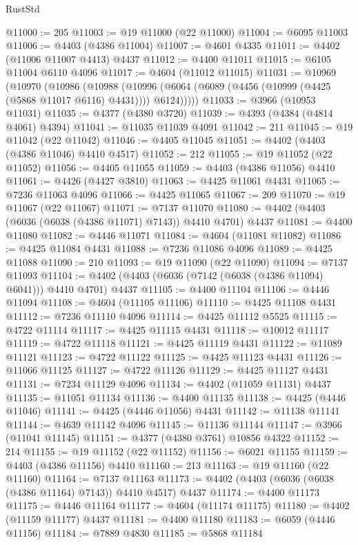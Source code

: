 \begin{lexlean}{RustStd}
\begin{coremodule}
@11000 := 205
@11003 := @19 @11000 (@22 @11000)
@11004 := @6095 @11003
@11006 := @4403 (@4386 @11004)
@11007 := @4601 @4335
@11011 := @4402 (@11006 @11007 @4413) @4437
@11012 := @4400 @11011
@11015 := @6105 @11004 @6110 @4096
@11017 := @4604 (@11012 @11015)
@11031 := @10969
    (@10970
      (@10986
        (@10988
          (@10996 (@6064 (@6089 (@4456 (@10999 (@4425 (@5868 @11017 @6116) @4431)))) @6124)))))
@11033 := @3966 (@10953 @11031)
@11035 := @4377 (@4380 @3720)
@11039 := @4393 (@4384 (@4814 @4061) @4394)
@11041 := @11035 @11039 @4091
@11042 := 211
@11045 := @19 @11042 (@22 @11042)
@11046 := @4405 @11045
@11051 := @4402 (@4403 (@4386 @11046) @4410 @4517)
@11052 := 212
@11055 := @19 @11052 (@22 @11052)
@11056 := @4405 @11055
@11059 := @4403 (@4386 @11056) @4410
@11061 := @4426 (@4427 @3810)
@11063 := @4425 @11061 @4431
@11065 := @7236 @11063 @4096
@11066 := @4425 @11065
@11067 := 209
@11070 := @19 @11067 (@22 @11067)
@11071 := @7137 @11070
@11080 := @4402 (@4403 (@6036 (@6038 (@4386 @11071) @7143)) @4410 @4701) @4437
@11081 := @4400 @11080
@11082 := @4446 @11071
@11084 := @4604 (@11081 @11082)
@11086 := @4425 @11084 @4431
@11088 := @7236 @11086 @4096
@11089 := @4425 @11088
@11090 := 210
@11093 := @19 @11090 (@22 @11090)
@11094 := @7137 @11093
@11104 := @4402 (@4403 (@6036 (@7142 (@6038 (@4386 @11094) @6041))) @4410 @4701) @4437
@11105 := @4400 @11104
@11106 := @4446 @11094
@11108 := @4604 (@11105 @11106)
@11110 := @4425 @11108 @4431
@11112 := @7236 @11110 @4096
@11114 := @4425 @11112 @5525
@11115 := @4722 @11114
@11117 := @4425 @11115 @4431
@11118 := @10012 @11117
@11119 := @4722 @11118
@11121 := @4425 @11119 @4431
@11122 := @11089 @11121
@11123 := @4722 @11122
@11125 := @4425 @11123 @4431
@11126 := @11066 @11125
@11127 := @4722 @11126
@11129 := @4425 @11127 @4431
@11131 := @7234 @11129 @4096
@11134 := @4402 (@11059 @11131) @4437
@11135 := @11051 @11134
@11136 := @4400 @11135
@11138 := @4425 (@4446 @11046)
@11141 := @4425 (@4446 @11056) @4431
@11142 := @11138 @11141
@11144 := @4639 @11142 @4096
@11145 := @11136 @11144
@11147 := @3966 (@11041 @11145)
@11151 := @4377 (@4380 @3761) @10856 @4322
@11152 := 214
@11155 := @19 @11152 (@22 @11152)
@11156 := @6021 @11155
@11159 := @4403 (@4386 @11156) @4410
@11160 := 213
@11163 := @19 @11160 (@22 @11160)
@11164 := @7137 @11163
@11173 := @4402 (@4403 (@6036 (@6038 (@4386 @11164) @7143)) @4410 @4517) @4437
@11174 := @4400 @11173
@11175 := @4446 @11164
@11177 := @4604 (@11174 @11175)
@11180 := @4402 (@11159 @11177) @4437
@11181 := @4400 @11180
@11183 := @6059 (@4446 @11156)
@11184 := @7889 @4830
@11185 := @5868 @11184

\end{coremodule}
\end{lexlean}
